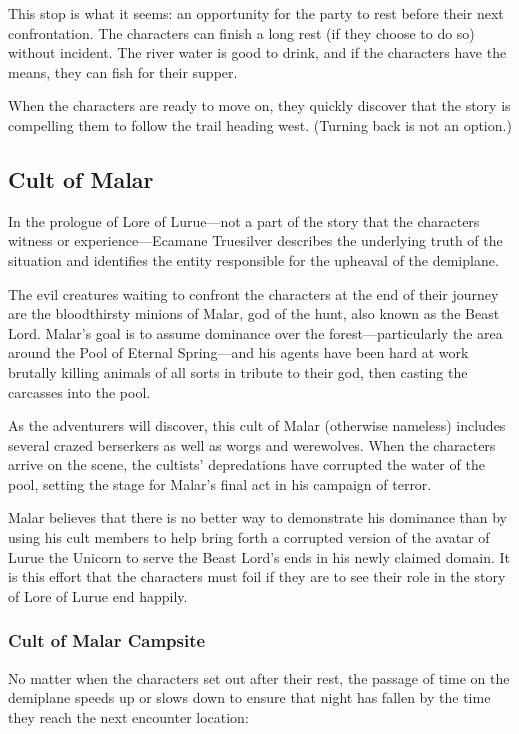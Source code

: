 \documentclass[10pt,a4paper,twoside,bg=print,twocolumn,openany,nodeprecatedcode]{dndbook}
\begin{document}
This stop is what it seems: an opportunity for the party to rest before their next confrontation. The characters can finish a long rest (if they choose to do so) without incident. The river water is good to drink, and if the characters have the means, they can fish for their supper.

When the characters are ready to move on, they quickly discover that the story is compelling them to follow the trail heading west. (Turning back is not an option.)

\subsection{Cult of Malar}
In the prologue of Lore of Lurue—not a part of the story that the characters witness or experience—Ecamane Truesilver describes the underlying truth of the situation and identifies the entity responsible for the upheaval of the demiplane.

The evil creatures waiting to confront the characters at the end of their journey are the bloodthirsty minions of Malar, god of the hunt, also known as the Beast Lord. Malar's goal is to assume dominance over the forest—particularly the area around the Pool of Eternal Spring—and his agents have been hard at work brutally killing animals of all sorts in tribute to their god, then casting the carcasses into the pool.

As the adventurers will discover, this cult of Malar (otherwise nameless) includes several crazed berserkers as well as worgs and werewolves. When the characters arrive on the scene, the cultists' depredations have corrupted the water of the pool, setting the stage for Malar's final act in his campaign of terror.

Malar believes that there is no better way to demonstrate his dominance than by using his cult members to help bring forth a corrupted version of the avatar of Lurue the Unicorn to serve the Beast Lord's ends in his newly claimed domain. It is this effort that the characters must foil if they are to see their role in the story of Lore of Lurue end happily.

\subsubsection{Cult of Malar Campsite}
No matter when the characters set out after their rest, the passage of time on the demiplane speeds up or slows down to ensure that night has fallen by the time they reach the next encounter location:
\end{document}

